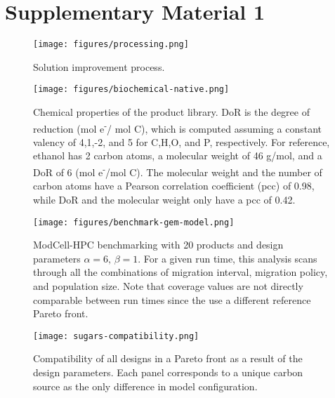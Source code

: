 \documentclass[12pt]{article}
\begin{document}
{\section*{Supplementary Material 1}
%

\setcounter{figure}{0}
\setcounter{table}{0}
\renewcommand{\thefigure}{S\arabic{figure}}
\renewcommand{\thetable}{S\arabic{table}}




\begin{figure}[H]
    \caption{Solution improvement process.}
    \centering
    \texttt{[image: figures/processing.png]}
    \label{fig7:processing}
\end{figure}

\begin{figure}[H]
    \caption{Chemical properties of the product library. DoR is the degree of reduction (mol e\textsuperscript{-}/ mol C), which is computed assuming a constant valency of 4,1,-2, and 5 for C,H,O, and P, respectively.  For reference, ethanol has 2 carbon atoms, a molecular weight of 46 g/mol, and a DoR of 6 (mol e\textsuperscript{-}/mol C). The molecular weight and the number of carbon atoms have a Pearson correlation coefficient (pcc) of 0.98, while DoR and the molecular weight only have a pcc of 0.42.}
    \centering
    \texttt{[image: figures/biochemical-native.png]}
    \label{fig7:biochemical-properties}
\end{figure}

\begin{figure}[H]
    \caption{ModCell-HPC benchmarking with 20 products and design parameters $\alpha=6, \,\beta=1$. For a given run time, this analysis scans through all the combinations of migration interval, migration policy, and population size. Note that coverage values are not directly comparable between run times since the use a different reference Pareto front.}
    \centering
    \texttt{[image: figures/benchmark-gem-model.png]}
    \label{fig7:benchmark-20prod}
\end{figure}


\begin{figure}[H]
    \caption{Compatibility of all designs in a Pareto front as a result of the design parameters. Each panel corresponds to a unique carbon source as the only difference in model configuration.}
    \centering
    \texttt{[image: sugars-compatibility.png]}
    \label{fig7:parameter-scan}
\end{figure}

}
\end{document}
